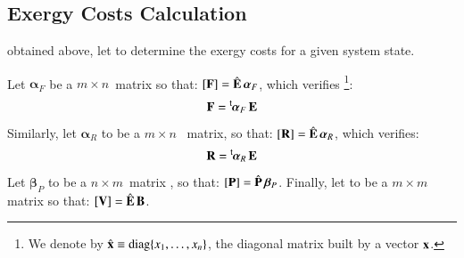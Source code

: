 \documentclass{ecos}
\begin{document}
\subsection{Exergy Costs Calculation}
 obtained above, let to determine the exergy costs for a given system state.

Let $\bm{\alpha}_F$ be a $m\times n$~matrix  so that: ${[\mathbf{F}]=\hat{\mathbf{E}}\,\bm{\alpha}_F}$, which verifies
\footnote{We denote by $\hat{\mathbf{x}}\equiv\text{diag}\{x_1,\ldots,x_n\}$, the diagonal matrix built  by a vector $\mathbf{x}$.}:
\begin{equation}
\mathbf{F}=\prescript{\smash{\mathsf{t}}}{}{\mskip-1mu}\bm{\alpha}_F\,\mathbf{E}
\end{equation}
Similarly, let $\bm{\alpha}_R$ to be a  $m\times n$~ matrix, so that: ${\left[ \textbf{R} \right]}=\hat{\mathbf{E}}\,\bm{\alpha}_R$, which verifies: 
\begin{equation}
\mathbf{R} = \prescript{\smash{\mathsf{t}}}{}{\mskip-1mu}\bm{\alpha}_R \, \mathbf{E}
\end{equation}
Let  ${\bm{\beta}_P}$ to be a $ n \times m$~matrix , so that: ${\left[ \textbf{P} \right]=\hat{\mathbf{P}}\,\bm{\beta}_P}$.
Finally, let  to be a  $m \times m$ matrix so that: ${\left[ \textbf{V} \right]=\hat{\mathbf{E}}\,\mathbf{B}}$.
\end{document}
